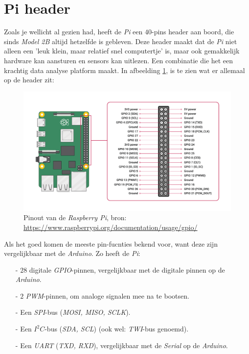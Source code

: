 \section{Pi header}
Zoals je wellicht al gezien had, heeft de \textit{Pi} een $40$-pins header aan boord, die sinds \textit{Model 2B} altijd hetzelfde is gebleven. Deze header maakt dat de \textit{Pi} niet alleen een 'leuk klein, maar relatief snel computertje' is, maar ook gemakkelijk hardware kan aansturen en sensors kan uitlezen. Een combinatie die het een krachtig data analyse platform maakt. In afbeelding \ref{fig:pi_header}, is te zien wat er allemaal op de header zit: \newline
\begin{figure}[h!]
\centering\includegraphics[scale=0.30]{Pictures/chapter05/pi_pinout.png}
\caption{Pinout van de \textit{Raspberry Pi}, bron: \url{https://www.raspberrypi.org/documentation/usage/gpio/}}
\label{fig:pi_header} %
\end{figure}

Als het goed komen de meeste pin-fucnties bekend voor, want deze zijn vergelijkbaar met de \textit{Arduino}. Zo heeft de \textit{Pi}:
\begin{enumerate}
	\item[-] $28$ digitale \textit{GPIO}-pinnen, vergelijkbaar met de digitale pinnen op de \textit{Arduino}.
	\item[-] $2$ \textit{PWM}-pinnen, om analoge signalen mee na te bootsen.
	\item[-] Een \textit{SPI}-bus (\textit{MOSI, MISO, SCLK}).
	\item[-] Een \textit{$I^2C$}-bus (\textit{SDA, SCL}) (ook wel: \textit{TWI}-bus genoemd). 
	\item[-] Een \textit{UART} (\textit{TXD, RXD}), vergelijkbaar met de \textit{Serial} op de \textit{Arduino}.
\end{enumerate}

